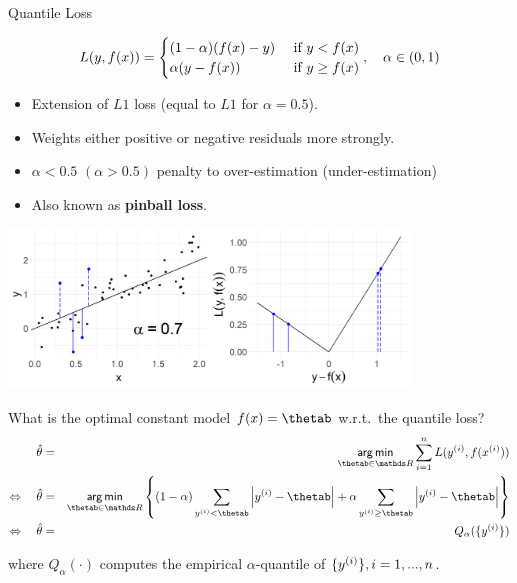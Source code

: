 \begin{vbframe}{Quantile Loss}
\vspace{-0.3cm}

\small
$$
L(y, f(x)) = \begin{cases} (1 - \alpha) (f(x) - y) & \text{ if } y < f(x)\\
\alpha (y - f(x)) & \text{ if } y \ge f(x)
\end{cases}, \quad \alpha \in (0, 1)
$$


\normalsize
\begin{itemize}
\item Extension of $L1$ loss (equal to $L1$ for $\alpha = 0.5$).
\item Weights either positive or negative residuals more strongly. 
\item $\alpha<0.5$ $(\alpha>0.5)$ penalty to over-estimation (under-estimation)
\item Also known as \textbf{pinball loss}.
\end{itemize}

\vfill

\begin{center}
\includegraphics[width = 0.8\textwidth]{figure/loss_quantile.png}
\end{center}

\framebreak

What is the optimal constant model $\fx = \thetab$ w.r.t.\ the quantile loss?
\vspace{-0.2cm}
\begin{eqnarray*}
\thetah&=& \argmin_{\thetab\in \R}\sumin \Lxyi \\
\Leftrightarrow\quad 
\thetah &=& \argmin_{\thetab \in \R}\left\{ (1 - \alpha) \sum_{\yi<\thetab}  \left|\yi-\thetab\right| + \alpha \sum_{\yi \geq\thetab}  \left|\yi-\thetab\right|\right\} \\
\Leftrightarrow\quad \thetah &=& Q_\alpha(\{\yi\})
\end{eqnarray*}

where $Q_\alpha(\cdot)$ computes the empirical $\alpha$-quantile of $\{y^{(i)}\}, i = 1, ..., n$.


\end{vbframe}

